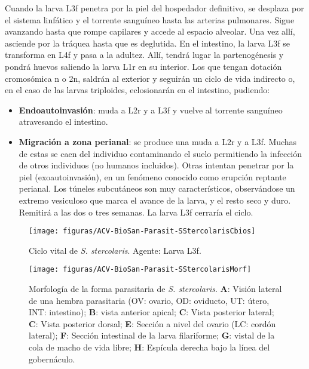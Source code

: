 Cuando la larva L3f penetra por la piel del hospedador definitivo, se desplaza por el sistema linfático y el torrente sanguíneo hasta las arterias pulmonares. Sigue avanzando hasta que rompe capilares y accede al espacio alveolar. Una vez allí, asciende por la tráquea hasta que es deglutida. En el intestino, la larva L3f se transforma en L4f y pasa a la adultez. Allí, tendrá lugar la partenogénesis y pondrá huevos saliendo la larva L1r en su interior. Los que tengan dotación cromosómica n o 2n, saldrán al exterior y seguirán un ciclo de vida indirecto o, en el caso de las larvas triploides, eclosionarán en el intestino, pudiendo:
\begin{itemize}[itemsep=0pt,parsep=0pt,topsep=0pt,partopsep=0pt]
	\item \textbf{Endoautoinvasión}: muda a L2r y a L3f y vuelve al torrente sanguíneo atravesando el intestino.
	\item \textbf{Migración a zona perianal}: se produce una muda a L2r y a L3f. Muchas de estas se caen del individuo contaminando el suelo permitiendo la infección de otros individuos (no humanos incluidos). Otras intentan penetrar por la piel (exoautoinvasión), en un fenómeno conocido como erupción reptante perianal. Los túneles subcutáneos son muy característicos, observándose un extremo vesiculoso que marca el avance de la larva, y el resto seco y duro. Remitirá a las dos o tres semanas. La larva L3f cerraría el ciclo.
\end{itemize}
\begin{multicols}{2}
	\begin{figure}[H]
		\centering
		\texttt{[image: figuras/ACV-BioSan-Parasit-SStercolarisCbios]}
		\caption[Ciclo vital de \textit{S. stercolaris}]{Ciclo vital de \textit{S. stercolaris}. Agente: Larva L3f.\label{fig:PARASIT:SStercolarisCBios}}
	\end{figure}
	\begin{figure}[H]
		\centering
		\texttt{[image: figuras/ACV-BioSan-Parasit-SStercolarisMorf]}
		\caption[Morfología de la forma parásita de \textit{S. stercolaris}]{Morfología de la forma parasitaria de \textit{S. stercolaris}. \textbf{A}: Visión lateral de una hembra parasitaria (OV: ovario, OD: oviducto, UT: útero, INT: intestino); \textbf{B}: vista anterior apical; \textbf{C}: Vista posterior lateral; \textbf{C}: Vista posterior dorsal; \textbf{E}: Sección a nivel del ovario (LC: cordón lateral); \textbf{F}: Sección intestinal de la larva filariforme; \textbf{G}: vistal de la cola de macho de vida libre; \textbf{H}: Espícula derecha bajo la línea del gobernáculo.\label{fig:PARASIT:SStercolarisMorf}}
	\end{figure}
\end{multicols}

